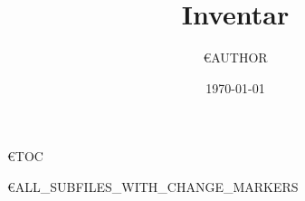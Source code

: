 \documentclass{article}
\title{Inventar}
\author{€{AUTHOR}}
\date{\today}
\begin{document}
\maketitle

€{TOC}

\pagebreak

€{ALL_SUBFILES_WITH_CHANGE_MARKERS}
\end{document}
